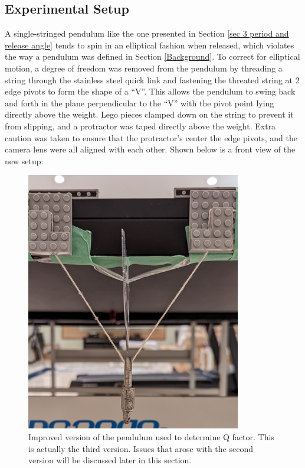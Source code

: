 \documentclass[11pt]{article}
\begin{document}
\begin{multicols}{2}
\subsection{Experimental Setup}
A single-stringed pendulum like the one presented in Section \ref{sec 3 period and release angle} tends to spin in an elliptical fashion when released, which violates the way a pendulum was defined in Section \ref{Background}. To correct for elliptical motion, a degree of freedom was removed from the pendulum by threading a string through the stainless steel quick link and fastening the threated string at 2 edge pivots to form the shape of a ``V''. This allows the pendulum to swing back and forth in the plane perpendicular to the ``V'' with the pivot point lying directly above the weight. Lego pieces clamped down on the string to prevent it from slipping, and a protractor was taped directly above the weight. Extra caution was taken to ensure that the protractor's center the edge pivots, and the camera lens were all aligned with each other. Shown below is a front view of the new setup:

\begin{figure}[H]
    \centering
    \includegraphics[width=\linewidth]{../figures/exp_setup3_front.png}
    \caption{\centering Improved version of the pendulum used to determine Q factor. This is actually the third version. Issues that arose with the second version will be discussed later in this section.}
    \label{fig:figure 3}
\end{figure}



\end{multicols}
\end{document}
